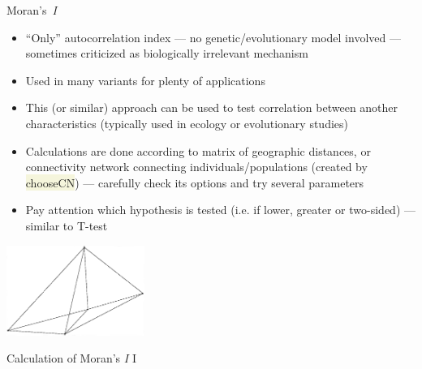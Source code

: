 \documentclass[compress, xelatex, 11pt, xcolor=svgnames, aspectratio=169,
	hyperref={
		bookmarks=true,
		unicode=true,
		colorlinks=true,
		pdftitle={Molecular data in R},
		plainpages=false,
		pdfauthor={Vojtech Zeisek},
		pdfsubject={Course about phylogeny and evolution in R},
		pdfcreator={XeLaTeX},
		pdfkeywords={R, evolution, phylogeny, molecular data},
		linkcolor=Crimson, %
		anchorcolor=Magenta, %
		citecolor=Magenta, %
		filecolor=Magenta, %
		menucolor=Magenta, %
		urlcolor=DodgerBlue, %
		},
	url={hyphens, lowtilde} %
	]{beamer}
\renewcommand{\texttt}[1]{\colorbox{Beige}{{\ttfamily #1}}}
\begin{document}
\begin{frame}{Moran's~\textit{I}}
	\begin{multicols}{2}
		\begin{itemize}
			\item \enquote{Only} autocorrelation index --- no genetic/evolutionary model involved --- sometimes criticized as biologically irrelevant mechanism
			\item Used in many variants for plenty of applications
			\item This (or similar) approach can be used to test correlation between another characteristics (typically used in ecology or evolutionary studies)
			\item Calculations are done according to matrix of geographic distances, or connectivity network connecting individuals/populations (created by \texttt{chooseCN}) --- carefully check its options and try several parameters
			\item Pay attention which hypothesis is tested (i.e. if lower, greater or two-sided) --- similar to T-test
		\end{itemize}
		\begin{center}
			\includegraphics[width=4.5cm]{choosecn.png}
		\end{center}
	\end{multicols}
\end{frame}

\begin{frame}[fragile]{Calculation of Moran's \textit{I} I}
\end{frame}
\end{document}
